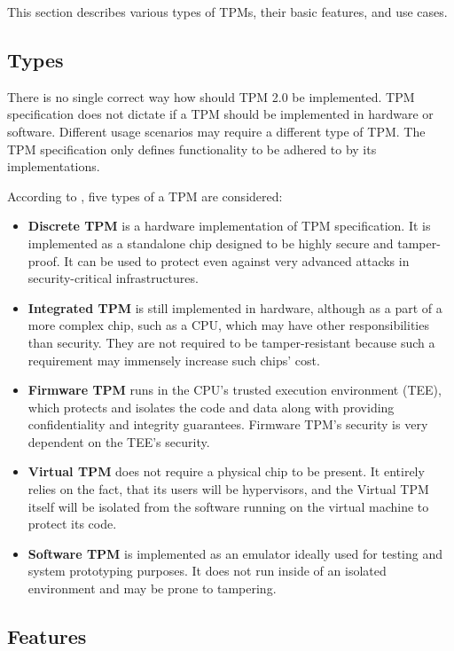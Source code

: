 This section describes various types of TPMs, their basic features, and use cases.

\subsection{Types}
There is no single correct way how should TPM 2.0 be implemented. TPM specification does not dictate if a TPM should be implemented in hardware or software. Different usage scenarios may require a different type of TPM. The TPM specification only defines functionality to be adhered to by its implementations. 

According to \cite{tcg_tpm2_briefintro}, five types of a TPM are considered:

\begin{itemize}
    \item \textbf{Discrete TPM} is a hardware implementation of TPM specification. It is implemented as a standalone chip designed to be highly secure and tamper-proof. It can be used to protect even against very advanced attacks in security-critical infrastructures.
    \item \textbf{Integrated TPM} is still implemented in hardware, although as a part of a more complex chip, such as a CPU, which may have other responsibilities than security. They are not required to be tamper-resistant because such a requirement may immensely increase such chips' cost.
    \item \textbf{Firmware TPM} runs in the CPU's trusted execution environment (TEE), which protects and isolates the code and data along with providing confidentiality and integrity guarantees. Firmware TPM's security is very dependent on the TEE's security.
    \item \textbf{Virtual TPM} does not require a physical chip to be present. It entirely relies on the fact, that its users will be hypervisors, and the Virtual TPM itself will be isolated from the software running on the virtual machine to protect its code. 
    \item \textbf{Software TPM} is implemented as an emulator ideally used for testing and system prototyping purposes. It does not run inside of an isolated environment and may be prone to tampering.
\end{itemize}

\subsection{Features}

